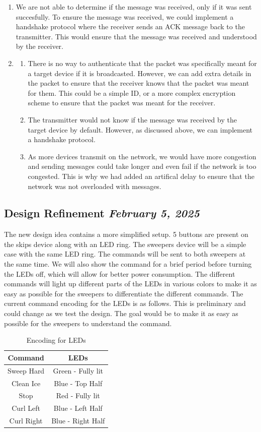 \documentclass{article}
\newcommand{\logbookentry}[2]{
    \subsection*{#1 \hfill \textit{#2}} 
}
\begin{document}
\begin{enumerate}
\begin{enumerate}[label=\alph*.]
        \item We are not able to determine if the message was received, only if it was sent succesfully. To ensure the message was received, we could implement a handshake protocol where the receiver sends an ACK message back to the transmitter. This would ensure that the message was received and understood by the receiver.
        \item \begin{enumerate}
            \item There is no way to authenticate that the packet was specifically meant for a target device if it is broadcasted. However, we can add extra details in the packet to ensure that the receiver knows that the packet was meant for them. This could be a simple ID, or a more complex encryption scheme to ensure that the packet was meant for the receiver.
            \item The transmitter would not know if the message was received by the target device by default. However, as discussed above, we can implement a handshake protocol.
            \item As more devices transmit on the network, we would have more congestion and sending messages could take longer and even fail if the network is too congested. This is why we had added an artifical delay to ensure that the network was not overloaded with messages.
        \end{enumerate}
    \end{enumerate}
\end{enumerate}

\logbookentry{Design Refinement}{February 5, 2025}
The new design idea contains a more simplified setup. 5 buttons are present on the skips device along with an LED ring. The sweepers device will be a simple case with the same LED ring. The commands will be sent to both sweepers at the same time. We will also show the command for a brief period before turning the LEDs off, which will allow for better power consumption. The different commands will light up different parts of the LEDs in various colors to make it as easy as possible for the sweepers to differentiate the different commands. The current command encoding for the LEDs is as follows. This is preliminary and could change as we test the design. The goal would be to make it as easy as possible for the sweepers to understand the command.
\begin{table}[ht!]
    \centering
    \begin{tabular}{|c|c|}
        \hline 
        \textbf{Command} & \textbf{LEDs} \\
        \hline
        Sweep Hard & Green - Fully lit \\
        Clean Ice & Blue - Top Half \\
        Stop & Red - Fully lit \\
        Curl Left & Blue - Left Half \\
        Curl Right & Blue - Right Half \\
        \hline
    \end{tabular}
    \caption{Encoding for LEDs}
\end{table}
\end{document}
